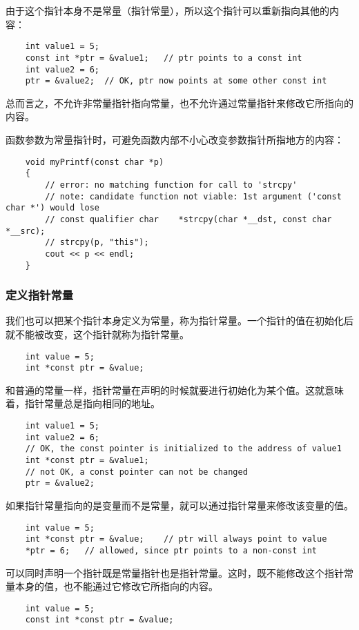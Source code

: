 \documentclass[UTF8]{ctexart}
\begin{document}
由于这个指针本身不是常量（指针常量），所以这个指针可以重新指向其他的内容：
\begin{verbatim}
    int value1 = 5;
    const int *ptr = &value1;   // ptr points to a const int
    int value2 = 6;
    ptr = &value2;  // OK, ptr now points at some other const int
\end{verbatim}

总而言之，不允许非常量指针指向常量，也不允许通过常量指针来修改它所指向的内容。

函数参数为常量指针时，可避免函数内部不小心改变参数指针所指地方的内容：
\begin{verbatim}
    void myPrintf(const char *p)
    {
        // error: no matching function for call to 'strcpy'
        // note: candidate function not viable: 1st argument ('const char *') would lose
        // const qualifier char    *strcpy(char *__dst, const char *__src);
        // strcpy(p, "this");
        cout << p << endl;
    }
\end{verbatim}

\subsubsection{定义指针常量}
我们也可以把某个指针本身定义为常量，称为指针常量。一个指针的值在初始化后就不能被改变，这个指针就称为指针常量。
\begin{verbatim}
    int value = 5;
    int *const ptr = &value;
\end{verbatim}

和普通的常量一样，指针常量在声明的时候就要进行初始化为某个值。这就意味着，指针常量总是指向相同的地址。
\begin{verbatim}
    int value1 = 5;
    int value2 = 6;
    // OK, the const pointer is initialized to the address of value1
    int *const ptr = &value1;
    // not OK, a const pointer can not be changed
    ptr = &value2;
\end{verbatim}

如果指针常量指向的是变量而不是常量，就可以通过指针常量来修改该变量的值。
\begin{verbatim}
    int value = 5;
    int *const ptr = &value;    // ptr will always point to value
    *ptr = 6;   // allowed, since ptr points to a non-const int
\end{verbatim}

可以同时声明一个指针既是常量指针也是指针常量。这时，既不能修改这个指针常量本身的值，也不能通过它修改它所指向的内容。
\begin{verbatim}
    int value = 5;
    const int *const ptr = &value;
\end{verbatim}
\end{document}

